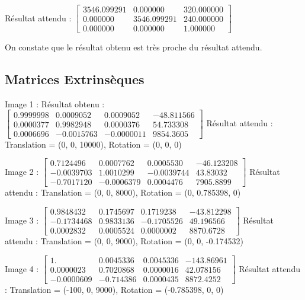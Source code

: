 \documentclass{article}
\begin{document}
Résultat attendu :
  $\begin{bmatrix}
    3546.099291 & 0.000000 & 320.000000 \\
    0.000000 & 3546.099291 & 240.000000 \\
    0.000000 & 0.000000 & 1.000000
  \end{bmatrix}$

On constate que le résultat obtenu est très proche du résultat attendu.

\subsection{Matrices Extrinsèques}

Image 1 :
Résultat obtenu :
$\begin{bmatrix}
  0.9999998 & 0.0009052 & 0.0009052 & - 48.811566 \\
  0.0000377 & 0.9982948 & 0.0000376 & 54.733308 \\
  0.0006696 & - 0.0015763 & - 0.0000011 & 9854.3605
\end{bmatrix}$
Résultat attendu :
Translation = (0, 0, 10000), Rotation = (0, 0, 0)

Image 2 :
$\begin{bmatrix}
  0.7124496 & 0.0007762 & 0.0005530 & - 46.123208 \\
  - 0.0039703 & 1.0010299 & - 0.0039744 & 43.83032 \\
  - 0.7017120 & - 0.0006379 & 0.0004476 & 7905.8899
\end{bmatrix}$
Résultat attendu :
Translation = (0, 0, 8000), Rotation = (0, 0.785398, 0)

Image 3 :
$\begin{bmatrix}
  0.9848432 & 0.1745697 & 0.1719238 & - 43.812298 \\
  - 0.1734468 & 0.9833136 & - 0.1705526 & 49.196566 \\
  0.0002832 & 0.0005524 & 0.0000002 & 8870.6728
\end{bmatrix}$
Résultat attendu :
Translation = (0, 0, 9000), Rotation = (0, 0, -0.174532)

Image 4 :
$\begin{bmatrix}
  1. & 0.0045336 & 0.0045336 & - 143.86961 \\
  0.0000023 & 0.7020868 & 0.0000016 & 42.078156 \\
  - 0.0000609 & - 0.714386 & 0.0000435 & 8872.4252
\end{bmatrix}$
Résultat attendu :
Translation = (-100, 0, 9000), Rotation = (-0.785398, 0, 0)
\end{document}
